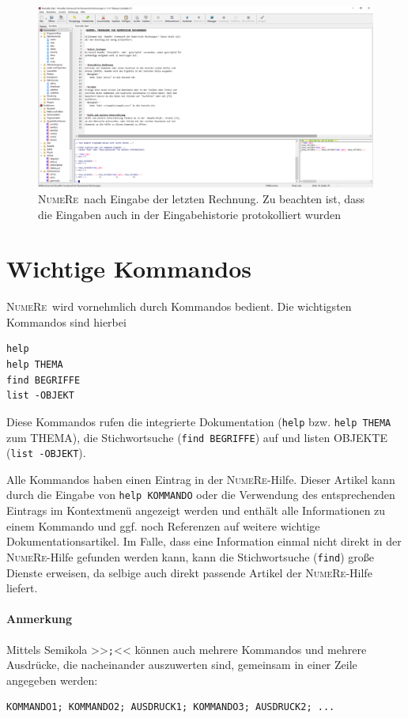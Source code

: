 \documentclass[DIV=14,headsepline,footsepline]{scrbook}
\newcommand{\NR}{\textsc{Nu\-me\-Re}}
\begin{document}
				\begin{figure}[htb]%
					\centering
					\includegraphics[width=\textwidth]{_graphics/first_calc_1.png}
					\caption{\NR\ nach Eingabe der letzten Rechnung. Zu beachten ist, dass die Eingaben auch in der Eingabehistorie protokolliert wurden}
					\label{fig:first_calc_1}
				\end{figure}
			\section{Wichtige Kommandos}
				\NR\ wird vornehmlich durch Kommandos bedient. Die wichtigsten Kommandos sind hierbei
					\begin{lstlisting}
help
help THEMA
find BEGRIFFE
list -OBJEKT
					\end{lstlisting}
					Diese Kommandos rufen die integrierte Dokumentation (\verb+help+ bzw. \verb+help THEMA+ zum THEMA), die Stichwortsuche (\verb+find BEGRIFFE+) auf und listen OBJEKTE (\verb+list -OBJEKT+).
					
					Alle Kommandos haben einen Eintrag in der \NR-Hilfe. Dieser Artikel kann durch die Eingabe von \verb+help KOMMANDO+ oder die Verwendung des entsprechenden Eintrags im Kontextmenü angezeigt werden und enthält alle Informationen zu einem Kommando und ggf. noch Referenzen auf weitere wichtige Dokumentationsartikel. Im Falle, dass eine Information einmal nicht direkt in der \NR-Hilfe gefunden werden kann, kann die Stichwortsuche (\verb+find+) große Dienste erweisen, da selbige auch direkt passende Artikel der \NR-Hilfe liefert.
					\paragraph{Anmerkung}
						Mittels Semikola >>\verb+;+<< können auch mehrere Kommandos und mehrere Ausdrücke, die nacheinander auszuwerten sind, gemeinsam in einer Zeile angegeben werden:
						\begin{lstlisting}
KOMMANDO1; KOMMANDO2; AUSDRUCK1; KOMMANDO3; AUSDRUCK2; ...
						\end{lstlisting}
\end{document}
